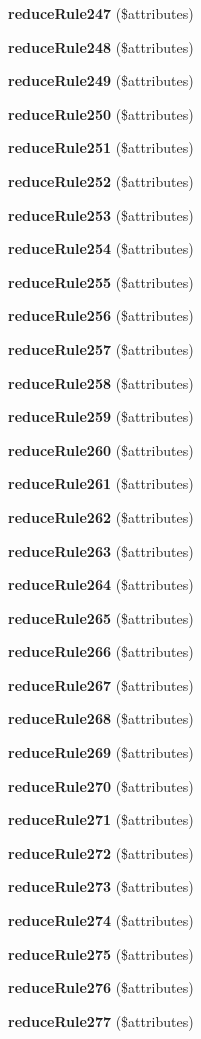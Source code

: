 \begin{DoxyCompactItemize}
\item 
{\bf reduce\+Rule247} (\$attributes)
\item 
{\bf reduce\+Rule248} (\$attributes)
\item 
{\bf reduce\+Rule249} (\$attributes)
\item 
{\bf reduce\+Rule250} (\$attributes)
\item 
{\bf reduce\+Rule251} (\$attributes)
\item 
{\bf reduce\+Rule252} (\$attributes)
\item 
{\bf reduce\+Rule253} (\$attributes)
\item 
{\bf reduce\+Rule254} (\$attributes)
\item 
{\bf reduce\+Rule255} (\$attributes)
\item 
{\bf reduce\+Rule256} (\$attributes)
\item 
{\bf reduce\+Rule257} (\$attributes)
\item 
{\bf reduce\+Rule258} (\$attributes)
\item 
{\bf reduce\+Rule259} (\$attributes)
\item 
{\bf reduce\+Rule260} (\$attributes)
\item 
{\bf reduce\+Rule261} (\$attributes)
\item 
{\bf reduce\+Rule262} (\$attributes)
\item 
{\bf reduce\+Rule263} (\$attributes)
\item 
{\bf reduce\+Rule264} (\$attributes)
\item 
{\bf reduce\+Rule265} (\$attributes)
\item 
{\bf reduce\+Rule266} (\$attributes)
\item 
{\bf reduce\+Rule267} (\$attributes)
\item 
{\bf reduce\+Rule268} (\$attributes)
\item 
{\bf reduce\+Rule269} (\$attributes)
\item 
{\bf reduce\+Rule270} (\$attributes)
\item 
{\bf reduce\+Rule271} (\$attributes)
\item 
{\bf reduce\+Rule272} (\$attributes)
\item 
{\bf reduce\+Rule273} (\$attributes)
\item 
{\bf reduce\+Rule274} (\$attributes)
\item 
{\bf reduce\+Rule275} (\$attributes)
\item 
{\bf reduce\+Rule276} (\$attributes)
\item 
{\bf reduce\+Rule277} (\$attributes)

\end{DoxyCompactItemize}
